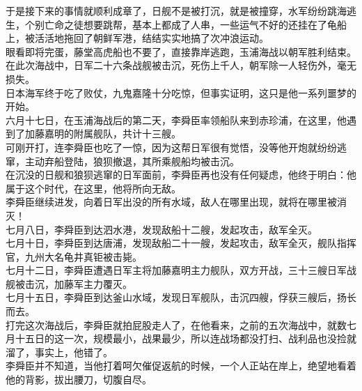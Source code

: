 \begin{multicols}{\theparacolNo}
于是接下来的事情就顺利成章了，日舰不是被打沉，就是被撞穿，水军纷纷跳海逃生，个别亡命之徒想要跳帮，基本上都成了人串，一些运气不好的还挂在了龟船上，被活活地拖回了朝鲜军港，结结实实地搞了次冲浪运动。\\

眼看即将完蛋，藤堂高虎船也不要了，直接靠岸逃跑，玉浦海战以朝军胜利结束。\\

在此次海战中，日军二十六条战舰被击沉，死伤上千人，朝军除一人轻伤外，毫无损失。\\

日本海军终于吃了败仗，九鬼嘉隆十分吃惊，但事实证明，这只是他一系列噩梦的开始。\\

六月十七日，在玉浦海战后的第二天，李舜臣率领船队来到赤珍浦，在这里，他遇到了加藤嘉明的附属舰队，共计十三艘。\\

可刚开打，连李舜臣也吃了一惊，因为这帮日军很有觉悟，没等他开炮就纷纷逃窜，主动弃船登陆，狼狈撤退，其所乘舰船均被击沉。\\

在沉没的日舰和狼狈逃窜的日军面前，李舜臣再也没有任何疑虑，他终于明白：他属于这个时代，在这里，他将所向无敌。\\

李舜臣继续进发，向着日军出没的所有水域，敌人在哪里出现，就将在哪里被消灭！\\

七月八日，李舜臣到达泗水港，发现敌船十二艘，发起攻击，敌军全灭。\\

七月十日，李舜臣到达唐浦，发现敌船二十一艘，发起攻击，敌军全灭，舰队指挥官，九州大名龟井真钜被击毙。\\

七月十二日，李舜臣遭遇日军主将加藤嘉明主力舰队，双方开战，三十三艘日军战舰被击沉，加藤军主力覆灭。\\

七月十五日，李舜臣到达釜山水域，发现日军舰队，击沉四艘，俘获三艘后，扬长而去。\\

打完这次海战后，李舜臣就拍屁股走人了，在他看来，之前的五次海战中，就数七月十五日的这一次，规模最小，战果最少，所以连战场都没打扫、战利品也没捡就溜了，事实上，他错了。\\

李舜臣并不知道，当他打着呵欠催促返航的时候，一个人正站在岸上，绝望地看着他的背影，拔出腰刀，切腹自尽。\\


\end{multicols}
